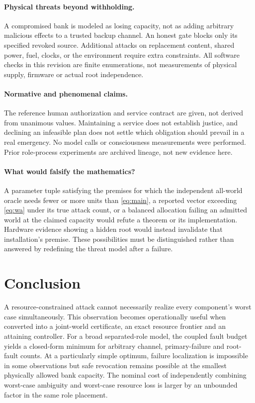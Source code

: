 \paragraph{Physical threats beyond withholding.}
A compromised bank is modeled as losing capacity, not as adding arbitrary malicious effects to a trusted backup channel. An honest gate blocks only its specified revoked source. Additional attacks on replacement content, shared power, fuel, clocks, or the environment require extra constraints. All software checks in this revision are finite enumerations, not measurements of physical supply, firmware or actual root independence.

\paragraph{Normative and phenomenal claims.}
The reference human authorization and service contract are given, not derived from unanimous values. Maintaining a service does not establish justice, and declining an infeasible plan does not settle which obligation should prevail in a real emergency. No model calls or consciousness measurements were performed. Prior role-process experiments are archived lineage, not new evidence here.

\paragraph{What would falsify the mathematics?}
A parameter tuple satisfying the premises for which the independent all-world oracle needs fewer or more units than \cref{eq:main}, a reported vector exceeding \cref{eq:wa} under its true attack count, or a balanced allocation failing an admitted world at the claimed capacity would refute a theorem or its implementation. Hardware evidence showing a hidden root would instead invalidate that installation's premise. These possibilities must be distinguished rather than answered by redefining the threat model after a failure.

\section{Conclusion}
A resource-constrained attack cannot necessarily realize every component's worst case simultaneously. This observation becomes operationally useful when converted into a joint-world certificate, an exact resource frontier and an attaining controller. For a broad separated-role model, the coupled fault budget yields a closed-form minimum for arbitrary channel, primary-failure and root-fault counts. At a particularly simple optimum, failure localization is impossible in some observations but safe revocation remains possible at the smallest physically allowed bank capacity. The nominal cost of independently combining worst-case ambiguity and worst-case resource loss is larger by an unbounded factor in the same role placement.

